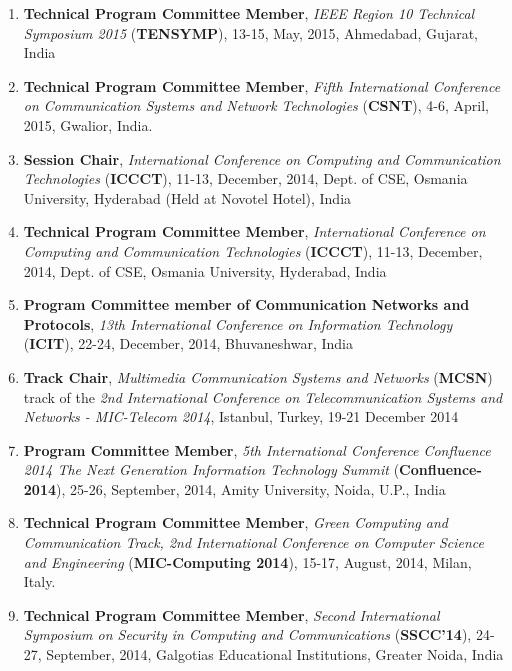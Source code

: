 \begin{enumerate} [label=(\arabic*).]
\item
\textbf{Technical Program Committee Member}, \textit{IEEE Region 10 Technical Symposium 2015} (\textbf{TENSYMP}), 13-15, May, 2015, Ahmedabad, Gujarat, India

\item
\textbf{Technical Program Committee Member}, \textit{Fifth International Conference on Communication Systems and Network Technologies} (\textbf{CSNT}), 4-6, April, 2015, Gwalior, India.

\item
\textbf{Session Chair}, \textit{International Conference on Computing and Communication Technologies} (\textbf{ICCCT}), 11-13, December, 2014, Dept. of CSE, Osmania University, Hyderabad (Held at Novotel Hotel), India

\item
\textbf{Technical Program Committee Member}, \textit{International Conference on Computing and Communication Technologies }(\textbf{ICCCT}), 11-13, December, 2014, Dept. of CSE, Osmania University, Hyderabad, India

\item
\textbf{Program Committee member of Communication Networks and Protocols}, \textit{13th International Conference on Information Technology} (\textbf{ICIT}), 22-24, December, 2014, Bhuvaneshwar, India

\item
\textbf{Track Chair}, \textit{Multimedia Communication Systems and Networks }(\textbf{MCSN}) track of the \textit{2nd International Conference on Telecommunication Systems and Networks - MIC-Telecom 2014}, Istanbul, Turkey, 19-21 December 2014 


\item
\textbf{Program Committee Member}, \textit{5th International Conference Confluence 2014 The Next Generation Information Technology Summit} (\textbf{Confluence-2014}), 25-26, September, 2014, Amity University, Noida, U.P., India

\item
\textbf{Technical Program Committee Member}, \textit{Green Computing and Communication Track, 2nd International Conference on Computer Science and Engineering} (\textbf{MIC-Computing 2014}), 15-17, August, 2014, Milan, Italy.

\item
\textbf{Technical Program Committee Member},\textit{ Second International Symposium on Security in Computing and Communications} (\textbf{SSCC’14}), 24-27, September, 2014, Galgotias Educational Institutions, Greater Noida, India


\end{enumerate}
